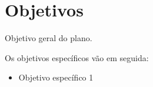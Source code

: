 \section{Objetivos}

\begin{large}
Objetivo geral do plano.

Os objetivos específicos vão em seguida:
\begin{itemize}
  \item Objetivo específico 1
\end{itemize}
\end{large}
